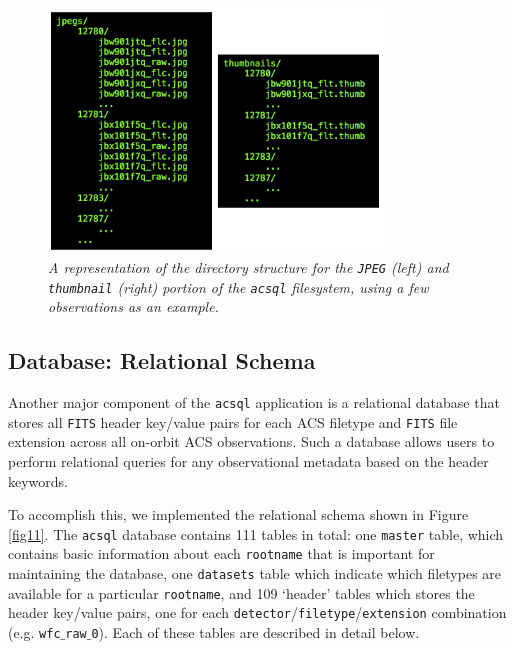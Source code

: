 \documentclass[10pt,journal,compsoc]{IEEEtran}
\begin{document}
\begin{figure}[!h]
\centering
\includegraphics[width=3.5in]{./figures/jpeg_filesystem.png}
\caption{\textit{A representation of the directory structure for the \texttt{JPEG} (left) and \texttt{thumbnail} (right) portion of the \texttt{acsql} filesystem, using a few observations
as an example.}}
\label{fig10}
\end{figure}


\subsection{Database: Relational Schema} \label{sec3.5}

Another major component of the \texttt{acsql} application is a relational database that stores all \texttt{FITS} header key/value pairs for each ACS filetype and \texttt{FITS} file
extension across all on-orbit ACS observations.  Such a database allows users to perform relational queries for any observational metadata based on the header keywords.

To accomplish this, we implemented the relational schema shown in Figure \ref{fig11}.  The \texttt{acsql} database contains 111 tables in total: one \texttt{master} table, which contains
basic information about each \texttt{rootname} that is important for maintaining the database, one \texttt{datasets} table which indicate which filetypes are available for a
particular \texttt{rootname}, and 109 `header' tables which stores the header key/value pairs, one for each \texttt{detector}/\texttt{filetype}/\texttt{extension} combination (e.g.
\texttt{wfc$\_$raw$\_$0}).  Each of these tables are described in detail below.
\end{document}
